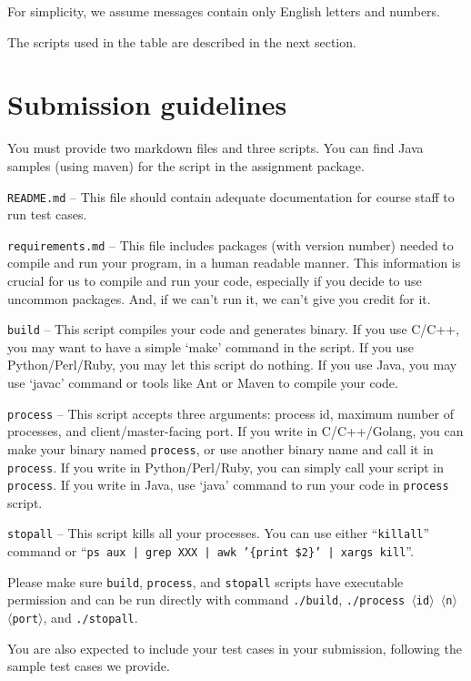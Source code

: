 \documentclass[11pt]{article}
\begin{document}
	For simplicity, we assume messages contain only English letters and	numbers. 
	
	The scripts used in the table are described in the next section.
	
	\section{Submission guidelines}
	\begin{compactitem}
		\item You must provide two markdown files and three scripts. You can find Java samples (using maven) for the script in the assignment package.
		\begin{compactitem}
			\item \texttt{README.md} -- This file should contain adequate documentation for course staff to run test cases.
			
			\item \texttt{requirements.md} -- This file includes packages (with version	number) needed to compile and run your program, in a human readable manner. This information is crucial for us to compile and run your code, especially if you decide to use uncommon packages. And, if we can't run it, we can't give you credit for it.
			\item \texttt{build} -- This script compiles your code and generates binary. If you use C/C++, you may want to have a simple `make' command in the script. If you use Python/Perl/Ruby, you may let this script do nothing. If you use Java, you may use `javac' command or tools like Ant or Maven to compile your code.
			
			\item \texttt{process} -- This script accepts three arguments: process id, maximum number of processes, and client/master-facing port. If you write in C/C++/Golang, you can make your binary named \texttt{process}, or use another binary name and call it in \texttt{process}. If	you write in Python/Perl/Ruby, you can simply call your script	in \texttt{process}. If you write in Java, use `java' command to run your code in \texttt{process} script.
			\item \texttt{stopall} -- This script kills all your processes. You can use either ``\texttt{killall}'' command or ``\texttt{ps aux | grep XXX | awk '\{print \$2\}' | xargs kill}''.
			\item Please make sure \texttt{build}, \texttt{process}, and \texttt{stopall} scripts have executable permission and can be run directly with command \texttt{./build}, \texttt{./process	$\langle$id$\rangle$ $\langle$n$\rangle$ $\langle$port$\rangle$}, and \texttt{./stopall}.
		\end{compactitem}
		\item You are also expected to include your test cases in your submission,
		following the sample test cases we provide.
	\end{compactitem}
	
\end{document}
